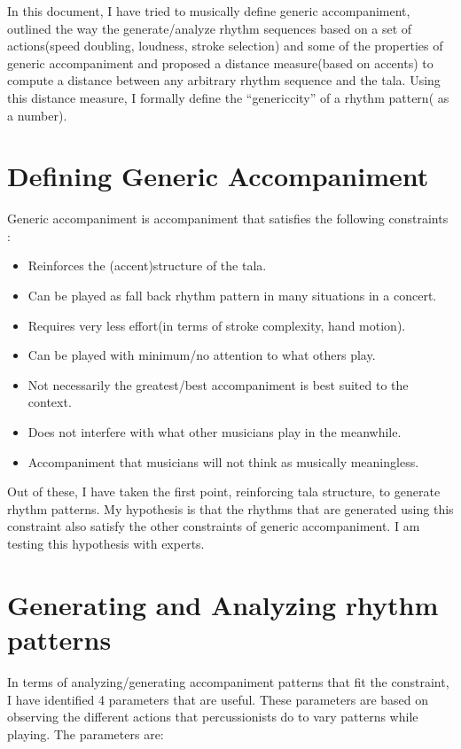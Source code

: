 
In this document, I have tried to musically define generic accompaniment, outlined the way the generate/analyze rhythm sequences based on a set of actions(speed doubling, loudness, stroke selection) and some of the properties of generic accompaniment and proposed a distance measure(based on accents) to compute a distance between any arbitrary rhythm sequence and the tala. Using this distance measure, I formally define the ``genericcity'' of a rhythm pattern( as a number).

\section{Defining Generic Accompaniment}

Generic accompaniment is accompaniment that satisfies the following constraints :

\begin{itemize}

\item Reinforces the (accent)structure of the tala.
\item Can be played as fall back rhythm pattern in many situations in a concert.
\item Requires very less effort(in terms of stroke complexity, hand motion).
\item Can be played with minimum/no attention to what others play.
\item Not necessarily the greatest/best accompaniment is best suited to the context.
\item Does not interfere with what other musicians play in the meanwhile.
\item Accompaniment that musicians will not think as musically meaningless.

\end{itemize}

Out of these, I have taken the first point, reinforcing tala structure, to generate rhythm patterns. My hypothesis is that the rhythms that are generated using this constraint also satisfy the other constraints of generic accompaniment. I am testing this hypothesis with experts.

\section{Generating and Analyzing rhythm patterns}

In terms of analyzing/generating accompaniment patterns that fit the constraint, I have identified 4 parameters that are useful.  These parameters are based on observing the different actions that percussionists do to vary patterns while playing. The parameters are:

